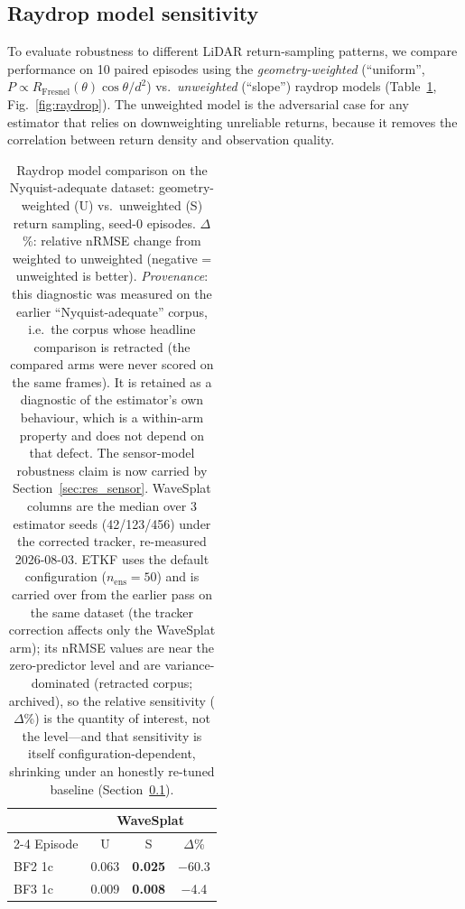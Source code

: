 \subsection{Raydrop model sensitivity}
\label{sec:raydrop-results}

To evaluate robustness to different LiDAR return-sampling patterns, we
compare performance on 10 paired episodes using the \emph{geometry-weighted}
(``uniform'', $P\propto R_{\text{Fresnel}}(\theta)\cos\theta/d^2$) vs.\
\emph{unweighted} (``slope'') raydrop models
(Table~\ref{tab:raydrop}, Fig.~\ref{fig:raydrop}).
The unweighted model is the adversarial case for any estimator that relies
on downweighting unreliable returns, because it removes the correlation
between return density and observation quality.

\begin{table}[t]
\centering
\caption{Raydrop model comparison on the Nyquist-adequate dataset:
geometry-weighted (U) vs.\ unweighted (S) return sampling, seed-0
episodes. $\Delta$\%: relative nRMSE change from weighted to unweighted
(negative = unweighted is better).
\emph{Provenance}: this diagnostic was measured on the earlier ``Nyquist-adequate'' corpus, i.e.\ the corpus whose headline comparison is retracted (the compared arms were never scored on the same frames). It is retained as a diagnostic of the estimator's own behaviour, which is a within-arm property and does not depend on that defect. The sensor-model robustness claim is now carried by Section~\ref{sec:res_sensor}.
WaveSplat columns are the median over 3 estimator seeds (42/123/456) under
the corrected tracker, re-measured 2026-08-03.
ETKF uses the default configuration ($n_{\text{ens}}{=}50$) and is carried
over from the earlier pass on the same dataset (the tracker correction
affects only the WaveSplat arm); its nRMSE
values are near the zero-predictor level and are variance-dominated
(retracted corpus; archived), so the relative
sensitivity ($\Delta$\%) is the quantity of interest, not the level---and
that sensitivity is itself configuration-dependent, shrinking under an
honestly re-tuned baseline (Section~\ref{sec:raydrop-results}).}
\label{tab:raydrop}
\begin{tabular}{lccc}
\toprule
& \multicolumn{3}{c}{WaveSplat} \\
\cmidrule(lr){2-4}
Episode & U & S & $\Delta$\% \\
\midrule
BF2 1c  & 0.063 & \textbf{0.025} & $-$60.3 \\
BF3 1c  & 0.009 & \textbf{0.008} & $-$4.4  \\

\end{tabular}
\end{table}

